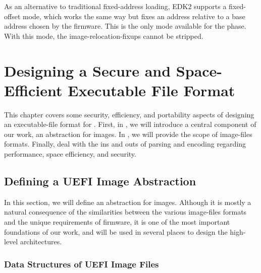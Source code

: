 As an alternative to traditional fixed-address loading, \gls{EDK2} supports a fixed-offset mode, which works the same way but fixes an address relative to a base address chosen by the \gls{firmware}. This is the only mode available for the  phase. With this mode, the \glspl{image-relocation-fixup} cannot be stripped.

\chapter{Designing a Secure and Space-Efficient Executable File Format} %
\label{chap:uefi_exec_design}

This chapter covers some security, efficiency, and portability aspects of designing an \gls{executable-file} format for . First, in , we will introduce a central component of our work, an abstraction for  \glspl{image}. In , we will provide the scope of  \glspl{image-file} formats. Finally,  deal with the ins and outs of parsing and encoding regarding performance, space efficiency, and security.

\section{Defining a UEFI Image Abstraction}
\label{sec:abstraction}

In this section, we will define an abstraction for  \glspl{image}. Although it is mostly a natural consequence of the similarities between the various \glspl{image-file} formats and the unique requirements of  \gls{firmware}, it is one of the most important foundations of our work, and will be used in several places to design the high-level architectures.

\subsection{Data Structures of UEFI Image Files}
\label{sec:abstr_data_structs}

